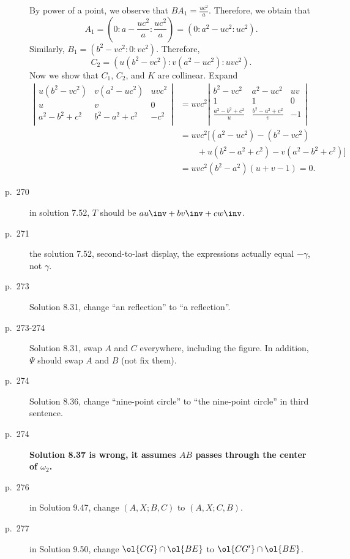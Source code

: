 \documentclass[11pt]{scrartcl}
\newcommand{\crucial}[1]{\textbf{\sffamily\large\color{red} #1}}
\begin{document}
\begin{description}
  By power of a point, we observe that $BA_1 = \frac{uc^2}{a}$.
  Therefore, we obtain that
  \[ A_1 = \left( 0:a-\frac{uc^2}{a}: \frac{uc^2}{a} \right)
    = \left( 0:a^{2}-uc^2 : uc^2 \right). \]
  Similarly, $B_1 = \left( b^2-vc^2 : 0 : vc^2 \right)$.
  Therefore,
  \[ C_2 = \left( u(b^2-vc^2) : v(a^2-uc^2) : uvc^2 \right). \]
  Now we show that $C_1$, $C_2$, and $K$ are collinear.
  Expand
  \begin{align*}
  \left\lvert
  \begin{array}{ccc}
    u (b^2-vc^2) & v (a^2-uc^2) & uv c^2 \\
    u & v & 0 \\
    a^2-b^2+c^2 & b^2-a^2+c^2 & -c^2 \\
  \end{array}
  \right\rvert
  &= uvc^2 \left\lvert
  \begin{array}{ccc}
    b^2-vc^2 & a^2-uc^2 & uv \\
    1 & 1 & 0 \\
    \frac{a^2-b^2+c^2}{u} & \frac{b^2-a^2+c^2}{v} & -1 \\
  \end{array}
  \right\rvert \\
  &= uvc^2 \Big[ (a^2-uc^2)-(b^2-vc^2) \\
    &\qquad+ u(b^2-a^2+c^2) - v(a^2-b^2+c^2) \Big] \\
    &= uvc^2 (b^2-a^2)(u+v-1) = 0.
  \end{align*}
\item[p.\  270] in solution 7.52, $T$ should be $au\inv+bv\inv+cw\inv$.
\item[p.\  271] the solution 7.52, second-to-last display, the expressions actually equal $-\gamma$, not $\gamma$.
\item[p.\ 273] Solution 8.31, change ``an reflection'' to ``a reflection''.
\item[p.\ 273-274] Solution 8.31, swap $A$ and $C$ everywhere, including the figure.
  In addition, $\Psi$ should swap $A$ and $B$ (not fix them).
\item[p.\  274] Solution 8.36, change ``nine-point circle'' to ``the nine-point circle'' in third sentence.
\item[p.\  274] \crucial{Solution 8.37 is wrong, it assumes $AB$ passes through the center of $\omega_2$.}
\item[p.\  276] in Solution 9.47, change $(A,X;B,C)$ to $(A,X;C,B)$.
\item[p.\  277] in Solution 9.50, change $\ol{CG} \cap \ol{BE}$ to $\ol{CG'} \cap \ol{BE}$.

\end{description}
\end{document}
